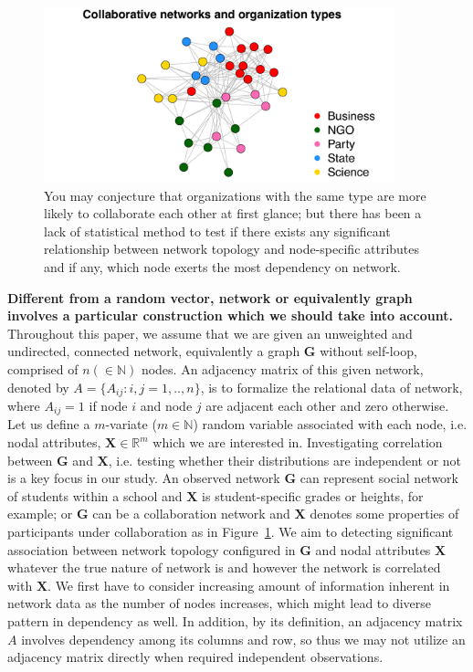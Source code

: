 \documentclass[12pt]{article}
\theoremstyle{definition}
\begin{document}
\begin{figure}[h]
	\centering
	\includegraphics[width=4in]{../../Figure/introplot.pdf}	
	\caption{You may conjecture that organizations with the same type are more likely to collaborate each other at first glance; but there has been a lack of statistical method to test if there exists any significant relationship between network topology and node-specific attributes and if any, which node exerts the most dependency on network.}
	\label{fig:intro}
\end{figure}

\textbf{Different from a random vector, network or equivalently graph involves a particular construction which we should take into account.} Throughout this paper, we assume that we are given an unweighted and undirected, connected network, equivalently a graph $\mathbf{G}$ without self-loop, comprised of $n (\in \mathbb{N})$ nodes. An adjacency matrix of this given network, denoted by $A = \{A_{ij} : i,j= 1,..,n \}$, is to formalize the relational data of network, where $A_{ij} = 1$ if node $i$ and node $j$ are adjacent each other and zero otherwise. Let us define a $m$-variate ($m \in \mathbb{N}$) random variable associated with each node, i.e. nodal attributes, $\mathbf{X}  \in \mathbb{R}^{m}$ which we are interested in. Investigating correlation between $\mathbf{G}$ and $\mathbf{X}$, i.e. testing whether their distributions are independent or not is a key focus in our study. An observed network $\mathbf{G}$ can represent social network of students within a school and $\mathbf{X}$ is student-specific grades or heights, for example; or $\mathbf{G}$ can be a collaboration network and $\mathbf{X}$ denotes some properties of participants under collaboration as in Figure~\ref{fig:intro}.  We aim to detecting significant association between network topology configured in $\mathbf{G}$ and nodal attributes $\mathbf{X}$ whatever the true nature of network is and however the network is correlated with $\mathbf{X}$. We first have to consider increasing amount of information inherent in network data as the number of nodes increases, which might lead to diverse pattern in dependency as well. In addition, by its definition, an adjacency matrix $A$ involves dependency among its columns and row, so thus we may not utilize an adjacency matrix directly when required independent observations.
	
\end{document}
